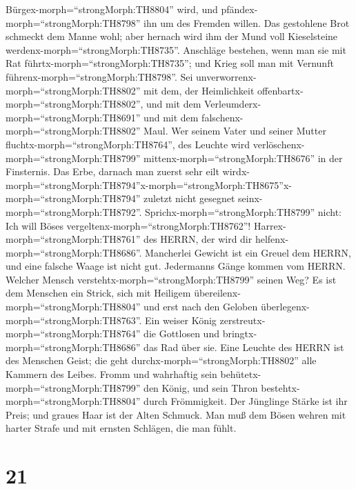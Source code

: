 Bürgex-morph=``strongMorph:TH8804'' wird, und
pfändex-morph=``strongMorph:TH8798'' ihn um des Fremden willen.
 Das gestohlene Brot schmeckt dem Manne wohl; aber hernach
wird ihm der Mund voll Kieselsteine
werdenx-morph=``strongMorph:TH8735''.  Anschläge bestehen,
wenn man sie mit Rat führtx-morph=``strongMorph:TH8735''; und Krieg soll
man mit Vernunft führenx-morph=``strongMorph:TH8798''.  Sei
unverworrenx-morph=``strongMorph:TH8802'' mit dem, der Heimlichkeit
offenbartx-morph=``strongMorph:TH8802'', und mit dem
Verleumderx-morph=``strongMorph:TH8691'' und mit dem
falschenx-morph=``strongMorph:TH8802'' Maul.  Wer seinem
Vater und seiner Mutter fluchtx-morph=``strongMorph:TH8764'', des
Leuchte wird verlöschenx-morph=``strongMorph:TH8799''
mittenx-morph=``strongMorph:TH8676'' in der Finsternis. 
Das Erbe, darnach man zuerst sehr eilt
wirdx-morph=``strongMorph:TH8794''\textbar x-morph=``strongMorph:TH8675''x-morph=``strongMorph:TH8794''
zuletzt nicht gesegnet seinx-morph=``strongMorph:TH8792''. 
Sprichx-morph=``strongMorph:TH8799'' nicht: Ich will Böses
vergeltenx-morph=``strongMorph:TH8762''!
Harrex-morph=``strongMorph:TH8761'' des HERRN, der wird dir
helfenx-morph=``strongMorph:TH8686''.  Mancherlei Gewicht
ist ein Greuel dem HERRN, und eine falsche Waage ist nicht gut.
 Jedermanns Gänge kommen vom HERRN. Welcher Mensch
verstehtx-morph=``strongMorph:TH8799'' seinen Weg?  Es ist
dem Menschen ein Strick, sich mit Heiligem
übereilenx-morph=``strongMorph:TH8804'' und erst nach den Geloben
überlegenx-morph=``strongMorph:TH8763''.  Ein weiser König
zerstreutx-morph=``strongMorph:TH8764'' die Gottlosen und
bringtx-morph=``strongMorph:TH8686'' das Rad über sie. 
Eine Leuchte des HERRN ist des Menschen Geist; die geht
durchx-morph=``strongMorph:TH8802'' alle Kammern des Leibes.
 Fromm und wahrhaftig sein
behütetx-morph=``strongMorph:TH8799'' den König, und sein Thron
bestehtx-morph=``strongMorph:TH8804'' durch Frömmigkeit. 
Der Jünglinge Stärke ist ihr Preis; und graues Haar ist der Alten
Schmuck.  Man muß dem Bösen wehren mit harter Strafe und
mit ernsten Schlägen, die man fühlt.

\hypertarget{section-20}{%
\section{21}\label{section-20}}

